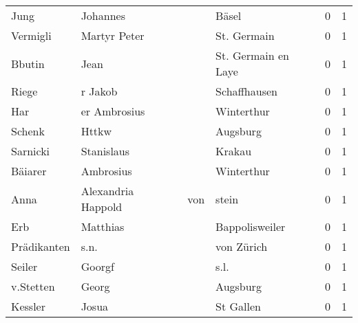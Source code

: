 \documentclass[10pt,a4paper,landscape]{article}
\begin{document}
\begin{longtable}{llllrr}
                     Jung &                           Johannes &             &                                       Bäsel &          0 &         1 \\
                 Vermigli &                       Martyr Peter &             &                                 St. Germain &          0 &         1 \\
                   Bbutin &                               Jean &             &                         St. Germain en Laye &          0 &         1 \\
                    Riege &                            r Jakob &             &                                Schaffhausen &          0 &         1 \\
                      Har &                       er Ambrosius &             &                                  Winterthur &          0 &         1 \\
                   Schenk &                              Httkw &             &                                    Augsburg &          0 &         1 \\
                 Sarnicki &                         Stanislaus &             &                                      Krakau &          0 &         1 \\
                  Bäiarer &                          Ambrosius &             &                                  Winterthur &          0 &         1 \\
                     Anna &                Alexandria  Happold &         von &                                       stein &          0 &         1 \\
                      Erb &                           Matthias &             &                              Bappolisweiler &          0 &         1 \\
              Prädikanten &                               s.n. &             &                                  von Zürich &          0 &         1 \\
                   Seiler &                             Goorgf &             &                                        s.l. &          0 &         1 \\
                v.Stetten &                              Georg &             &                                    Augsburg &          0 &         1 \\
                  Kessler &                              Josua &             &                                   St Gallen &          0 &         1 \\

\end{longtable}
\end{document}
